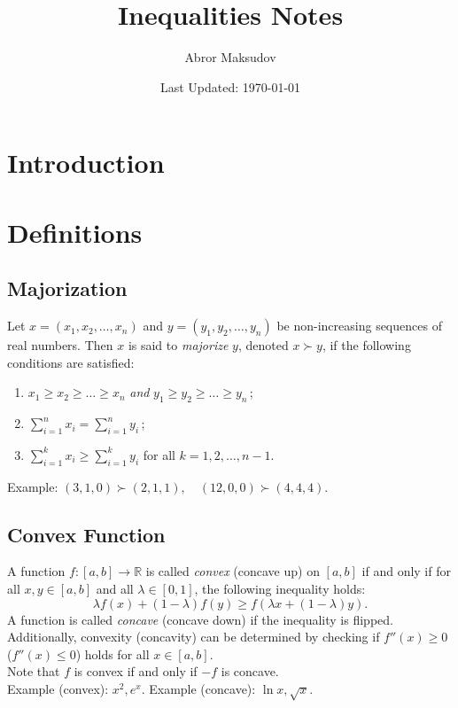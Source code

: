 \documentclass[a4paper,11pt]{article}
\title{Inequalities Notes}
\author{Abror Maksudov}
\date{Last Updated: \today}
\begin{document}
\maketitle
\tableofcontents

\section{Introduction}


\section{Definitions}


\subsection{Majorization}
\begin{tcolorbox}
    Let $x = (x_1, x_2, \dots, x_n)$ and $y = (y_1, y_2, \dots, y_n)$ be non-increasing sequences of real numbers. Then $x$ is said to \emph{majorize} $y$, denoted $x \succ y$, if the following conditions are satisfied:
    \begin{enumerate}
        \item $x_1 \geq x_2 \geq \dots \geq x_n$ \emph{and} $y_1 \geq y_2 \geq \dots \geq y_n$\,;
        \item $\sum_{i=1}^n x_i = \sum_{i=1}^n y_i$\,;
        \item $\sum_{i=1}^k x_i \geq \sum_{i=1}^k y_i$ for all $k = 1, 2, \dots, n-1$.
    \end{enumerate}
    Example: $(3,1,0) \succ (2,1,1), \quad (12, 0,0) \succ (4,4,4)$.
\end{tcolorbox}


\subsection{Convex Function}
\begin{tcolorbox}
    A function $f : [a,b] \to \mathbb{R}$ is called \textit{convex} (concave up) on $[a,b]$ if and only if for all $x,y \in [a,b]$ and all $\lambda \in [0,1]$, the following inequality holds:
    \[
    \lambda f(x) + (1-\lambda)f(y) \geq f(\lambda x + (1-\lambda)y).
    \]
    A function is called \textit{concave} (concave down) if the inequality is flipped. \\[6pt]
    Additionally, convexity (concavity) can be determined by checking if $f''(x) \geq 0$ \newline ($f''(x) \leq 0$) holds for all $x \in [a,b]$. \\[6pt]
    Note that $f$ is convex if and only if $-f$ is concave. \\[6pt]
    Example (convex): $x^2, e^x$. Example (concave): $\ln{x}, \sqrt{x}$.
\end{tcolorbox}
\end{document}
